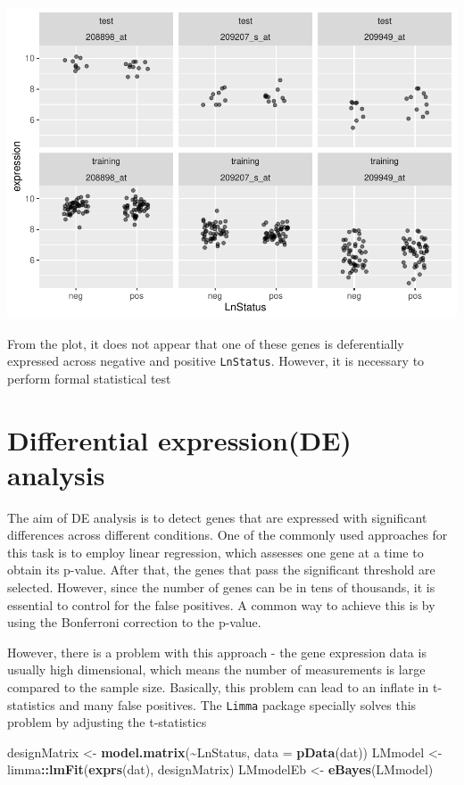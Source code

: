 \documentclass[
]{article}
\newenvironment{Shaded}{\begin{snugshade}}{\end{snugshade}}
\newcommand{\AttributeTok}[1]{\textcolor[rgb]{0.13,0.29,0.53}{#1}}
\newcommand{\FunctionTok}[1]{\textcolor[rgb]{0.13,0.29,0.53}{\textbf{#1}}}
\newcommand{\NormalTok}[1]{#1}
\newcommand{\OtherTok}[1]{\textcolor[rgb]{0.56,0.35,0.01}{#1}}
\newcommand{\SpecialCharTok}[1]{\textcolor[rgb]{0.81,0.36,0.00}{\textbf{#1}}}
\begin{document}
\includegraphics{Classification-of-disease-status-with-machine-learning-methods_files/figure-latex/scatterplot-1.pdf}

From the plot, it does not appear that one of these genes is
deferentially expressed across negative and positive \texttt{LnStatus}.
However, it is necessary to perform formal statistical test

\hypertarget{differential-expressionde-analysis}{%
\section{Differential expression(DE)
analysis}\label{differential-expressionde-analysis}}

The aim of DE analysis is to detect genes that are expressed with
significant differences across different conditions. One of the commonly
used approaches for this task is to employ linear regression, which
assesses one gene at a time to obtain its p-value. After that, the genes
that pass the significant threshold are selected. However, since the
number of genes can be in tens of thousands, it is essential to control
for the false positives. A common way to achieve this is by using the
Bonferroni correction to the p-value.

However, there is a problem with this approach - the gene expression
data is usually high dimensional, which means the number of measurements
is large compared to the sample size. Basically, this problem can lead
to an inflate in t-statistics and many false positives. The
\texttt{Limma} package specially solves this problem by adjusting the
t-statistics

\begin{Shaded}
\begin{Highlighting}[]
\NormalTok{designMatrix }\OtherTok{\textless{}{-}} \FunctionTok{model.matrix}\NormalTok{(}\SpecialCharTok{\textasciitilde{}}\NormalTok{LnStatus, }\AttributeTok{data =} \FunctionTok{pData}\NormalTok{(dat))}
\NormalTok{LMmodel }\OtherTok{\textless{}{-}}\NormalTok{ limma}\SpecialCharTok{::}\FunctionTok{lmFit}\NormalTok{(}\FunctionTok{exprs}\NormalTok{(dat), designMatrix)}
\NormalTok{LMmodelEb }\OtherTok{\textless{}{-}} \FunctionTok{eBayes}\NormalTok{(LMmodel)}
\end{Highlighting}
\end{Shaded}
\end{document}
